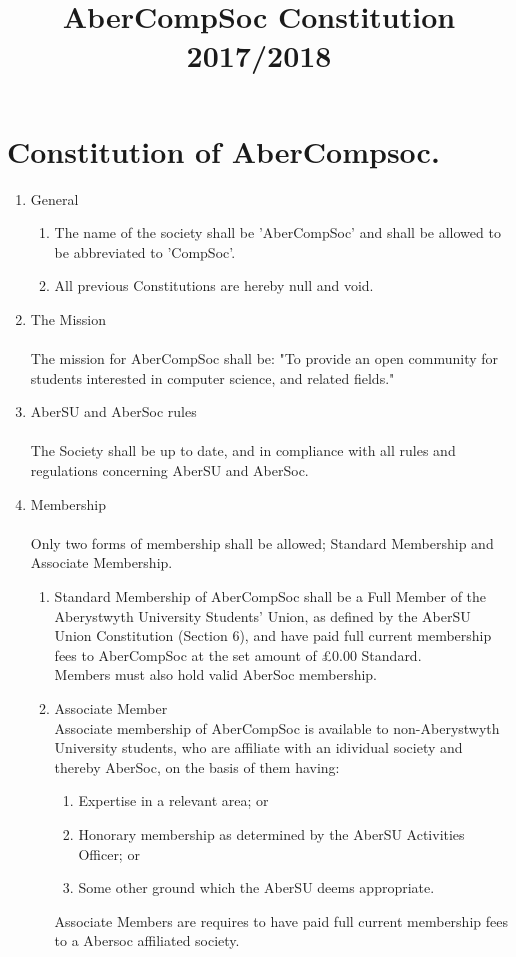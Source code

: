 \documentclass{article}
\begin{document}
\title{AberCompSoc Constitution 2017/2018}
\author{}
\date{}
\maketitle
\part{Constitution of AberCompsoc.}
\begin{enumerate}
    \item General
        \begin{enumerate}
            \item The name of the society shall be 'AberCompSoc' and shall be allowed to be abbreviated to 'CompSoc'.
            \item All previous Constitutions are hereby null and void.
        \end{enumerate}
    \item The Mission
        \\\\ The mission for AberCompSoc shall be: "To provide an open community for students interested in computer science, and related fields."
    \item AberSU and AberSoc rules
        \\\\ The Society shall be up to date, and in compliance with all rules and regulations concerning AberSU and AberSoc. 
    \item Membership
        \\\\ Only two forms of membership shall be allowed; Standard Membership and Associate Membership.
        \begin{enumerate}
            \item Standard Membership of AberCompSoc shall be a Full Member of the Aberystwyth University Students’ Union, as defined by the AberSU Union Constitution (Section 6), and have paid full current membership fees to AberCompSoc at the set amount of £0.00 Standard. \\Members must also hold valid AberSoc membership.
            \item Associate Member 
                \\ Associate membership of AberCompSoc is available to non-Aberystwyth University students, who are affiliate with an idividual society and thereby AberSoc, on the basis of them having:
                \begin{enumerate}
                    \item Expertise in a relevant area; or
                    \item Honorary membership as determined by the AberSU Activities Officer; or
                    \item Some other ground which the AberSU deems appropriate.
                \end{enumerate}
                Associate Members are requires to have paid full current membership fees to a Abersoc affiliated society.


\end{enumerate}
\end{enumerate}
\end{document}
